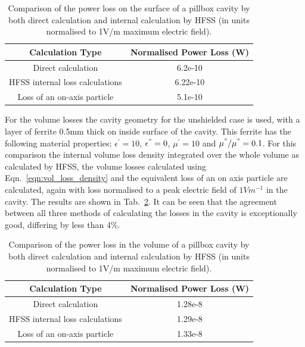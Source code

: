 \begin{table}
\caption{Comparison of the power loss on the surface of a pillbox cavity by both direct calculation and internal calculation by HFSS (in units normalised to 1V/m maximum electric field).}
\begin{center}
\begin{tabular}{c | c }
Calculation Type & Normalised Power Loss (W)\\ \hline
Direct calculation & 6.2e-10\\ \hline
HFSS internal loss calculations & 6.22e-10 \\ \hline
Loss of an on-axis particle	 & 5.1e-10 \\
\end{tabular}
\end{center}
\label{tab:surface_losses_ferr}
\end{table}

For the volume losses the cavity geometry for the unshielded case is used, with a layer of ferrite 0.5mm thick on inside surface of the cavity. This ferrite has the following material properties; $\epsilon^{'} = 10$, $\epsilon^{"}=0$, $\mu^{'}=10$ and $\mu^{"} / \mu^{"} = 0.1$. For this comparison the internal volume loss density integrated over the whole volume as calculated by HFSS, the volume losses calculated using Eqn.~\ref{eqn:vol_loss_density} and the equivalent loss of an on axis particle are calculated, again with loss normalised to a peak electric field of $1 V m^{-1}$ in the cavity. The results are shown in Tab.~\ref{tab:volume_losses_ferr}. It can be seen that the agreement between all three methods of calculating the losses in the cavity is exceptionally good, differing by less than 4\%.

\begin{table}
\caption{Comparison of the power loss in the volume of a pillbox cavity by both direct calculation and internal calculation by HFSS (in units normalised to 1V/m maximum electric field).}
\begin{center}
\begin{tabular}{c | c }
Calculation Type & Normalised Power Loss (W)\\ \hline
Direct calculation & 1.28e-8\\ \hline
HFSS internal loss calculations & 1.29e-8 \\ \hline
Loss of an on-axis particle & 1.33e-8 \\
\end{tabular}
\end{center}
\label{tab:volume_losses_ferr}
\end{table}


